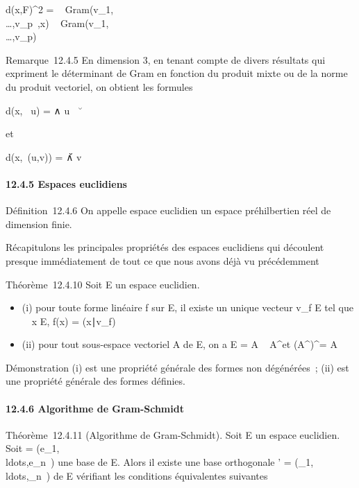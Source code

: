 \documentclass[]{article}
\begin{document}
d(x,F)^2 =
~
Gram(v_1,\\\ldots,v_p~,x)
\over
{}~
Gram(v_1,\\\ldots,v_p)~

Remarque~12.4.5 En dimension 3, en tenant compte de divers résultats qui
expriment le déterminant de Gram en fonction du produit mixte ou de la
norme du produit vectoriel, on obtient les formules

d(x, ~u) = \x ∧ u\
\over
\u\

et

d(x,\mathrmVect~(u,v)) =
\big  [u,v,x] \big
 \over \u ∧
v\

\paragraph{12.4.5 Espaces euclidiens}

Définition~12.4.6 On appelle espace euclidien un espace préhilbertien
réel de dimension finie.

Récapitulons les principales propriétés des espaces euclidiens qui
découlent presque immédiatement de tout ce que nous avons déjà vu
précédemment

Théorème~12.4.10 Soit E un espace euclidien.

\begin{itemize}
\itemsep1pt\parskip0pt
\item
  (i) pour toute forme linéaire f sur E, il existe un unique vecteur
  v_f \in E tel que \forall~~x \in E, f(x) =
  (x∣v_f)
\item
  (ii) pour tout sous-espace vectoriel A de E, on a E = A \oplus~
  A^\bot et (A^\bot)^\bot = A
\end{itemize}

Démonstration (i) est une propriété générale des formes non dégénérées~;
(ii) est une propriété générale des formes définies.

\paragraph{12.4.6 Algorithme de Gram-Schmidt}

Théorème~12.4.11 (Algorithme de Gram-Schmidt). Soit E un espace
euclidien. Soit  =
(e_1,\\ldots,e_n~)
une base de E. Alors il existe une base orthogonale ' =
(\epsilon_1,\\ldots,\epsilon_n~)
de E vérifiant les conditions équivalentes suivantes
\end{document}
